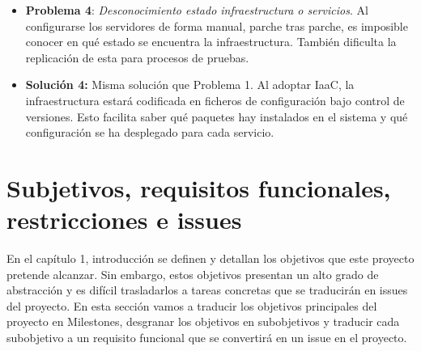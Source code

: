 \begin{itemize}
			\item \textbf{Problema 4}: \textit{Desconocimiento estado infraestructura o servicios}. Al configurarse los servidores de forma manual, parche tras parche, es imposible conocer en qué estado se encuentra la infraestructura. También dificulta la replicación de esta para procesos de pruebas.
			
			\item \textbf{Solución 4:} Misma solución que Problema 1. Al adoptar IaaC, la infraestructura estará codificada en ficheros de configuración bajo control de versiones. Esto facilita saber qué paquetes hay instalados en el sistema y qué configuración se ha desplegado para cada servicio.	
		\end{itemize}


\section{Subjetivos, requisitos funcionales, restricciones e issues}
	\begin{text}
		En el capítulo 1, introducción se definen y detallan los objetivos que este proyecto pretende alcanzar. Sin embargo, estos objetivos presentan un alto grado de abstracción y es difícil trasladarlos a tareas concretas que se traducirán en issues del proyecto. En esta sección vamos a traducir los objetivos principales del proyecto en Milestones, desgranar los objetivos en subobjetivos y traducir cada subobjetivo a un requisito funcional que se convertirá en un issue en el proyecto.
	\end{text}

